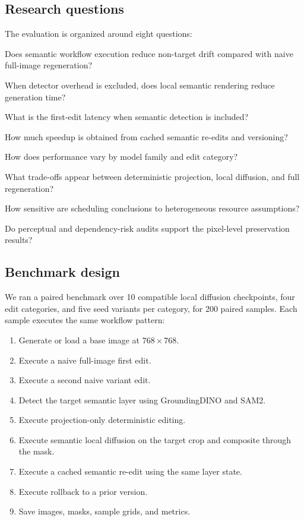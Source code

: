 \documentclass[final,5p,times,number,sort&compress]{elsarticle}
\begin{document}
\subsection{Research questions}

The evaluation is organized around eight questions:

\begin{description}[leftmargin=*]
    \item[RQ1] Does semantic workflow execution reduce non-target drift compared with naive full-image regeneration?
    \item[RQ2] When detector overhead is excluded, does local semantic rendering reduce generation time?
    \item[RQ3] What is the first-edit latency when semantic detection is included?
    \item[RQ4] How much speedup is obtained from cached semantic re-edits and versioning?
    \item[RQ5] How does performance vary by model family and edit category?
    \item[RQ6] What trade-offs appear between deterministic projection, local diffusion, and full regeneration?
    \item[RQ7] How sensitive are scheduling conclusions to heterogeneous resource assumptions?
    \item[RQ8] Do perceptual and dependency-risk audits support the pixel-level preservation results?
\end{description}

\subsection{Benchmark design}

We ran a paired benchmark over 10 compatible local diffusion checkpoints, four edit categories, and five seed variants per category, for 200 paired samples. Each sample executes the same workflow pattern:

\begin{enumerate}[leftmargin=*]
    \item Generate or load a base image at \(768 \times 768\).
    \item Execute a naive full-image first edit.
    \item Execute a second naive variant edit.
    \item Detect the target semantic layer using GroundingDINO and SAM2.
    \item Execute projection-only deterministic editing.
    \item Execute semantic local diffusion on the target crop and composite through the mask.
    \item Execute a cached semantic re-edit using the same layer state.
    \item Execute rollback to a prior version.
    \item Save images, masks, sample grids, and metrics.
\end{enumerate}
\end{document}
